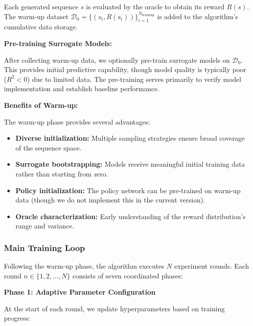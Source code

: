 \documentclass[conference]{IEEEtran}
\begin{document}
Each generated sequence $s$ is evaluated by the oracle to obtain its reward $R(s)$. The warm-up dataset $\mathcal{D}_0 = \{(s_i, R(s_i))\}_{i=1}^{N_{\text{warmup}}}$ is added to the algorithm's cumulative data storage.

\textbf{Pre-training Surrogate Models:}

After collecting warm-up data, we optionally pre-train surrogate models on $\mathcal{D}_0$. This provides initial predictive capability, though model quality is typically poor ($R^2 < 0$) due to limited data. The pre-training serves primarily to verify model implementation and establish baseline performance.

\textbf{Benefits of Warm-up:}

The warm-up phase provides several advantages:
\begin{itemize}
    \item \textbf{Diverse initialization:} Multiple sampling strategies ensure broad coverage of the sequence space.
    \item \textbf{Surrogate bootstrapping:} Models receive meaningful initial training data rather than starting from zero.
    \item \textbf{Policy initialization:} The policy network can be pre-trained on warm-up data (though we do not implement this in the current version).
    \item \textbf{Oracle characterization:} Early understanding of the reward distribution's range and variance.
\end{itemize}

\subsubsection{Main Training Loop}

Following the warm-up phase, the algorithm executes $N$ experiment rounds. Each round $n \in \{1, 2, \ldots, N\}$ consists of seven coordinated phases:

\textbf{Phase 1: Adaptive Parameter Configuration}

At the start of each round, we update hyperparameters based on training progress:
\end{document}
